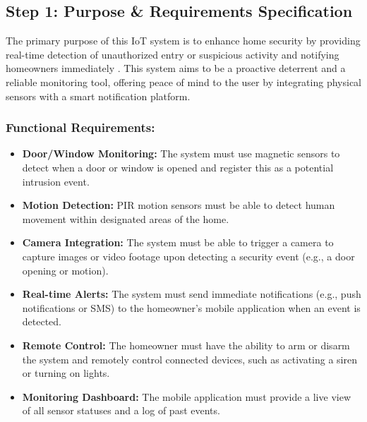 \documentclass[conference]{IEEEtran}
\begin{document}
\subsection{Step 1: Purpose \& Requirements Specification}
The primary purpose of this IoT system is to enhance home security by providing real-time detection of unauthorized entry or suspicious activity and notifying homeowners immediately \cite{yamini_home_intrusion_2016, achtaich2021guidelines, seerangan_domain_specific_iot_home_automation_2022}. This system aims to be a proactive deterrent and a reliable monitoring tool, offering peace of mind to the user by integrating physical sensors with a smart notification platform.
\subsubsection{\textbf{Functional Requirements:} \cite{wang_iot_devices_security_2024, design_implementation_smart_home_IoT_2024}}
\begin{itemize}
    \item \textbf{Door/Window Monitoring:} The system must use magnetic sensors to detect when a door or window is opened and register this as a potential intrusion event.
    \item \textbf{Motion Detection:} PIR motion sensors must be able to detect human movement within designated areas of the home.
    \item \textbf{Camera Integration:} The system must be able to trigger a camera to capture images or video footage upon detecting a security event (e.g., a door opening or motion).
    \item \textbf{Real-time Alerts:} The system must send immediate notifications (e.g., push notifications or SMS) to the homeowner's mobile application when an event is detected.
    \item \textbf{Remote Control:} The homeowner must have the ability to arm or disarm the system and remotely control connected devices, such as activating a siren or turning on lights.
    \item \textbf{Monitoring Dashboard:} The mobile application must provide a live view of all sensor statuses and a log of past events.
\end{itemize}
\end{document}
